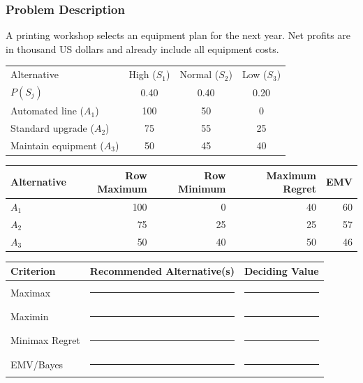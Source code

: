 \subsubsection*{Problem Description}
A printing workshop selects an equipment plan for the next year. Net profits are in thousand US dollars and already include all equipment costs.
\begin{center}
\begin{tabular}{lccc}\toprule
Alternative & High ($S_1$) & Normal ($S_2$) & Low ($S_3$)\\
$P(S_j)$ & 0.40 & 0.40 & 0.20\\\midrule
Automated line ($A_1$) & 100 & 50 & 0\\
Standard upgrade ($A_2$) & 75 & 55 & 25\\
Maintain equipment ($A_3$) & 50 & 45 & 40\\\bottomrule
\end{tabular}
\end{center}
\begin{center}
\begin{tabular}{lrrrr}\toprule
Alternative & Row Maximum & Row Minimum & Maximum Regret & EMV\\\midrule
$A_1$ & 100 & 0 & 40 & 60\\
$A_2$ & 75 & 25 & 25 & 57\\
$A_3$ & 50 & 40 & 50 & 46\\\bottomrule
\end{tabular}
\end{center}
\begin{center}
\begin{tabular}{lll}\toprule
Criterion & Recommended Alternative(s) & Deciding Value\\\midrule
Maximax & \rule{3cm}{0.4pt} & \rule{2cm}{0.4pt}\\
Maximin & \rule{3cm}{0.4pt} & \rule{2cm}{0.4pt}\\
Minimax Regret & \rule{3cm}{0.4pt} & \rule{2cm}{0.4pt}\\
EMV/Bayes & \rule{3cm}{0.4pt} & \rule{2cm}{0.4pt}\\\bottomrule
\end{tabular}
\end{center}


